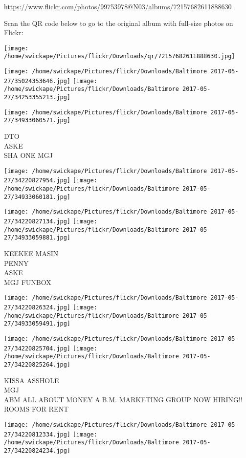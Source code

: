 \documentclass[10pt,letterpaper]{article}
\begin{document}
\url{https://www.flickr.com/photos/99753978@N03/albums/72157682611888630}

Scan the QR code below to go to the original album with full-size photos on Flickr:

\texttt{[image: /home/swickape/Pictures/flickr/Downloads/qr/72157682611888630.jpg]}
\pagebreak

\texttt{[image: /home/swickape/Pictures/flickr/Downloads/Baltimore 2017-05-27/35024353646.jpg]}
\texttt{[image: /home/swickape/Pictures/flickr/Downloads/Baltimore 2017-05-27/34253355213.jpg]}

\vspace{0.25in}
\texttt{[image: /home/swickape/Pictures/flickr/Downloads/Baltimore 2017-05-27/34933060571.jpg]}

DTO\\
ASKE\\
SHA ONE MGJ
\pagebreak

\texttt{[image: /home/swickape/Pictures/flickr/Downloads/Baltimore 2017-05-27/34220827954.jpg]}
\texttt{[image: /home/swickape/Pictures/flickr/Downloads/Baltimore 2017-05-27/34933060181.jpg]}

\texttt{[image: /home/swickape/Pictures/flickr/Downloads/Baltimore 2017-05-27/34220827134.jpg]}
\texttt{[image: /home/swickape/Pictures/flickr/Downloads/Baltimore 2017-05-27/34933059881.jpg]}

KEEKEE MASIN\\
PENNY\\
ASKE\\
MGJ FUNBOX
\pagebreak

\texttt{[image: /home/swickape/Pictures/flickr/Downloads/Baltimore 2017-05-27/34220826324.jpg]}
\texttt{[image: /home/swickape/Pictures/flickr/Downloads/Baltimore 2017-05-27/34933059491.jpg]}

\texttt{[image: /home/swickape/Pictures/flickr/Downloads/Baltimore 2017-05-27/34220825704.jpg]}
\texttt{[image: /home/swickape/Pictures/flickr/Downloads/Baltimore 2017-05-27/34220825264.jpg]}

KISSA ASSHOLE\\
MGJ\\
ABM ALL ABOUT MONEY A.B.M. MARKETING GROUP NOW HIRING!!\\
ROOMS FOR RENT
\pagebreak

\texttt{[image: /home/swickape/Pictures/flickr/Downloads/Baltimore 2017-05-27/34220812334.jpg]}
\texttt{[image: /home/swickape/Pictures/flickr/Downloads/Baltimore 2017-05-27/34220824234.jpg]}
\end{document}
